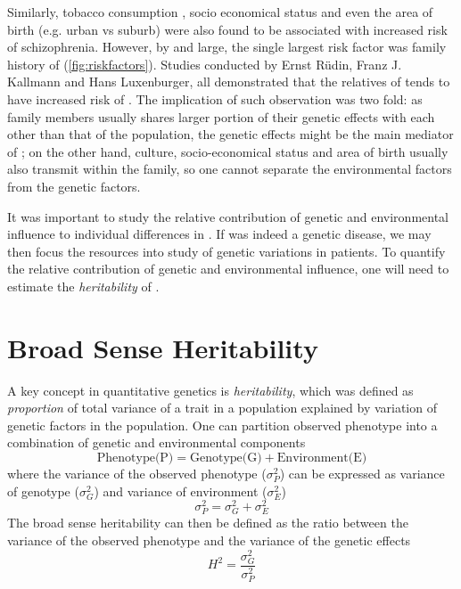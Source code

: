\documentclass[12pt]{book}
\newcommand*{\glng}{\glsentrylong}
\begin{document}
	Similarly, tobacco consumption \citep{Kelly1999}, socio economical status and even the area of birth (e.g. urban vs suburb) were also found to be associated with increased risk of schizophrenia\citep{McGrath2008a}.
	However, by and large, the single largest risk factor was family history of \glng{scz}(\cref{fig:riskfactors})\citep{Sullivan2005}.
	Studies conducted by Ernst R{\"u}din, Franz J. Kallmann and Hans Luxenburger, all demonstrated that the relatives of \glng{scz} tends to have increased risk of \glng{scz}\citep{Gottesman1982}. 
	The implication of such observation was two fold:
	as family members usually shares larger portion of their genetic effects with each other than that of the population, the genetic effects might be the main mediator of \glng{scz}; 
	on the other hand, culture, socio-economical status and area of birth usually also transmit within the family, so one cannot separate the environmental factors from the genetic factors.


	It was important to study the relative contribution of genetic and environmental influence to individual differences in \glng{scz}.
	If \glng{scz} was indeed a genetic disease, we may then focus the resources into study of genetic variations in \glng{scz} patients. 
	To quantify the relative contribution of genetic and environmental influence, one will need to estimate the \emph{heritability} of \glng{scz}.
	
	\section{Broad Sense Heritability}

	A key concept in quantitative genetics is \emph{heritability}, which was defined as \emph{proportion} of total variance of a trait in a population explained by variation of genetic factors in the population.
	One can partition observed phenotype into a combination of genetic and environmental components\citep{Falconer1996}
	$$
	\text{Phenotype(P)}=\text{Genotype(G)}+\text{Environment(E)}
	$$
	where the variance of the observed phenotype ($\sigma_P^2$) can be expressed as variance of genotype ($\sigma_G^2$) and variance of environment ($\sigma_E^2$)
	$$
		\sigma_P^2=\sigma_G^2+\sigma_E^2
	$$
	The broad sense heritability can then be defined as the ratio between the variance of the observed phenotype and the variance of the genetic effects
	$$
	H^2=\frac{\sigma_G^2}{\sigma_P^2}
	$$
	
\end{document}

